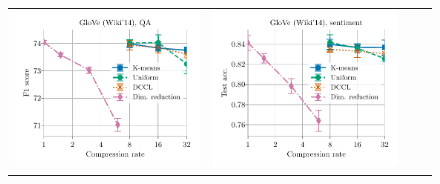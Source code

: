 \begin{figure}
	\centering
	\begin{tabular}{@{\hskip -0.0in}c@{\hskip -0.0in}c@{\hskip -0.0in}c@{\hskip -0.0in}c@{\hskip -0.0in}}
		\includegraphics[width=.245\linewidth]{figures/glove400k_qa_best-f1_vs_compression_linx_stoc.pdf} &
		\includegraphics[width=.245\linewidth]{figures/glove400k_sentiment_sst_test-acc_vs_compression_linx_stoc.pdf} &

\end{tabular}
\end{figure}
